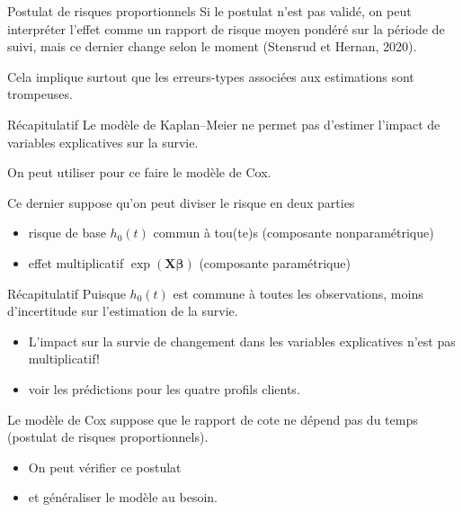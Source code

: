 \documentclass[
  ignorenonframetext,
]{beamer}
\providecommand{\tightlist}{%
  \setlength{\itemsep}{0pt}\setlength{\parskip}{0pt}}
\begin{document}
\begin{frame}{Postulat de risques proportionnels}
\protect{}\label{postulat-de-risques-proportionnels-1}
Si le postulat n'est pas validé, on peut interpréter l'effet comme un
rapport de risque moyen pondéré sur la période de suivi, mais ce dernier
change selon le moment (Stensrud et Hernan, 2020).

Cela implique surtout que les erreurs-types associées aux estimations
sont trompeuses.
\end{frame}

\begin{frame}{Récapitulatif}
\protect{}\label{ruxe9capitulatif-5}
Le modèle de Kaplan--Meier ne permet pas d'estimer l'impact de variables
explicatives sur la survie.

On peut utiliser pour ce faire le modèle de Cox.

Ce dernier suppose qu'on peut diviser le risque en deux parties

\begin{itemize}
\tightlist
\item
  risque de base \(h_0(t)\) commun à tou(te)s (composante
  nonparamétrique)
\item
  effet multiplicatif \(\exp(\mathbf{X}\boldsymbol{\beta})\) (composante
  paramétrique)
\end{itemize}
\end{frame}

\begin{frame}{Récapitulatif}
\protect{}\label{ruxe9capitulatif-6}
Puisque \(h_0(t)\) est commune à toutes les observations, moins
d'incertitude sur l'estimation de la survie.

\begin{itemize}
\tightlist
\item
  L'impact sur la survie de changement dans les variables explicatives
  n'est pas multiplicatif!
\item
  voir les prédictions pour les quatre profils clients.
\end{itemize}

Le modèle de Cox suppose que le rapport de cote ne dépend pas du temps
(postulat de risques proportionnels).

\begin{itemize}
\tightlist
\item
  On peut vérifier ce postulat
\item
  et généraliser le modèle au besoin.
\end{itemize}
\end{frame}
\end{document}
